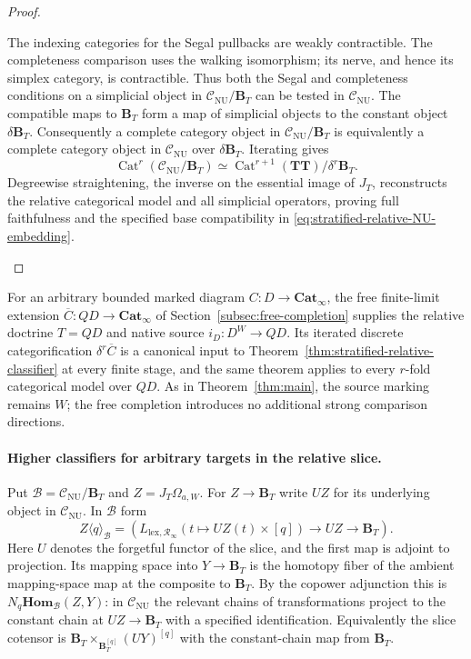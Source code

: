 \documentclass[oneside]{article}
\theoremstyle{plain}
\theoremstyle{definition}
\theoremstyle{remark}
\newcommand{\B}{\mathbf B}
\newcommand{\CNU}{\mathcal C_{\mathrm{NU}}}
\newcommand{\Cat}{\mathbf{Cat}_{\infty}}
\newcommand{\Homc}{\mathbf{Hom}}
\newcommand{\J}{J}
\newcommand{\RNU}{\mathcal R_{\infty}}
\newcommand{\TT}{\mathbf{TT}}
\begin{document}
\begin{proof}
\begin{enumerate}
The indexing categories for the Segal pullbacks are weakly
contractible. The completeness comparison uses the walking
isomorphism; its nerve, and hence its simplex category, is
contractible. Thus both the Segal and completeness conditions on
a simplicial object in $\CNU/\B_T$ can be tested in $\CNU$.
The compatible maps to $\B_T$ form a map of simplicial objects to
the constant object $\delta\B_T$. Consequently a complete category
object in $\CNU/\B_T$ is equivalently a complete category object
in $\CNU$ over $\delta\B_T$. Iterating gives
\[
 \operatorname{Cat}^r(\CNU/\B_T)
 \simeq\operatorname{Cat}^{r+1}(\TT)/\delta^r\B_T.
\]
Degreewise straightening, the inverse on the essential image of
$\J_T$, reconstructs the relative categorical model and all
simplicial operators, proving full faithfulness and the specified
base compatibility in \eqref{eq:stratified-relative-NU-embedding}.
\qedhere
\end{enumerate}
\end{proof}

For an arbitrary bounded marked diagram $C:D\to\Cat$, the free
finite-limit extension $\overline C:QD\to\Cat$ of
Section~\ref{subsec:free-completion} supplies the relative doctrine
$T=QD$ and native source $i_D:D^W\to QD$.  Its iterated discrete
categorification $\delta^r\overline C$ is a canonical input to
Theorem~\ref{thm:stratified-relative-classifier} at every finite
stage, and the same theorem applies to every $r$-fold categorical
model over $QD$.  As in Theorem~\ref{thm:main}, the source marking
remains $W$; the free completion introduces no additional strong
comparison directions.

\paragraph{Higher classifiers for arbitrary targets in the relative slice.}
Put $\mathcal B=\CNU/\B_T$ and $Z=\J_T\Omega_{a,W}$. For $Z\to\B_T$
write $UZ$ for its underlying object in $\CNU$. In $\mathcal B$ form
\[
 Z\langle q\rangle_{\mathcal B}
 =\left(L_{\mathrm{lex},\RNU}(t\mapsto UZ(t)\times[q])
              \longrightarrow UZ\longrightarrow\B_T\right).
\]
Here $U$ denotes the forgetful functor of the slice, and the first map
is adjoint to projection. Its mapping space into
$Y\to\B_T$ is the homotopy fiber of the ambient mapping-space map
at the composite to $\B_T$. By the copower adjunction this is
$N_q\Homc_{\mathcal B}(Z,Y)$: in $\CNU$ the relevant chains of
transformations project to the constant chain at $UZ\to\B_T$ with
a specified identification. Equivalently the slice cotensor is
$\B_T\times_{\B_T^{[q]}} (UY)^{[q]}$ with the constant-chain map
from $\B_T$.
\end{document}

